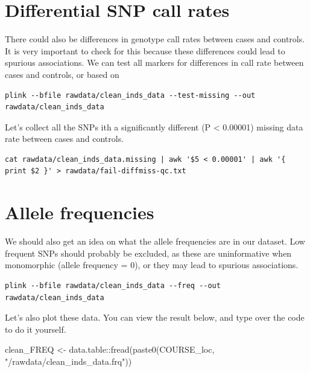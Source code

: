 \documentclass[
]{book}
\newenvironment{Shaded}{\begin{snugshade}}{\end{snugshade}}
\newcommand{\FunctionTok}[1]{\textcolor[rgb]{0.00,0.00,0.00}{#1}}
\newcommand{\NormalTok}[1]{#1}
\newcommand{\OtherTok}[1]{\textcolor[rgb]{0.56,0.35,0.01}{#1}}
\newcommand{\SpecialCharTok}[1]{\textcolor[rgb]{0.00,0.00,0.00}{#1}}
\newcommand{\StringTok}[1]{\textcolor[rgb]{0.31,0.60,0.02}{#1}}
\begin{document}
\hypertarget{differential-snp-call-rates}{%
\section{Differential SNP call rates}\label{differential-snp-call-rates}}

There could also be differences in genotype call rates between cases and controls. It is very important to check for this because these differences could lead to spurious associations. We can test all markers for differences in call rate between cases and controls, or based on

\begin{verbatim}
plink --bfile rawdata/clean_inds_data --test-missing --out rawdata/clean_inds_data
\end{verbatim}

Let's collect all the SNPs ith a significantly different (P \textless{} 0.00001) missing data rate between cases and controls.

\begin{verbatim}
cat rawdata/clean_inds_data.missing | awk '$5 < 0.00001' | awk '{ print $2 }' > rawdata/fail-diffmiss-qc.txt
\end{verbatim}

\hypertarget{allele-frequencies}{%
\section{Allele frequencies}\label{allele-frequencies}}

We should also get an idea on what the allele frequencies are in our dataset. Low frequent SNPs should probably be excluded, as these are uninformative when monomorphic (allele frequency = 0), or they may lead to spurious associations.

\begin{verbatim}
plink --bfile rawdata/clean_inds_data --freq --out rawdata/clean_inds_data
\end{verbatim}

Let's also plot these data. You can view the result below, and type over the code to do it yourself.

\begin{Shaded}
\begin{Highlighting}[]
\NormalTok{clean\_FREQ }\OtherTok{\textless{}{-}}\NormalTok{ data.table}\SpecialCharTok{::}\FunctionTok{fread}\NormalTok{(}\FunctionTok{paste0}\NormalTok{(COURSE\_loc, }\StringTok{"/rawdata/clean\_inds\_data.frq"}\NormalTok{))}
\end{Highlighting}
\end{Shaded}
\end{document}
